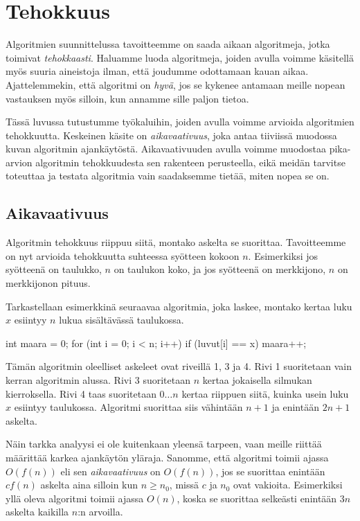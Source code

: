 \chapter{Tehokkuus}

Algoritmien suunnittelussa tavoitteemme on saada aikaan
algoritmeja, jotka toimivat \emph{tehokkaasti}.
Haluamme luoda algoritmeja, joiden avulla voimme
käsitellä myös suuria aineistoja ilman, että joudumme
odottamaan kauan aikaa.
Ajattelemmekin, että algoritmi on \emph{hyvä},
jos se kykenee antamaan meille nopean vastauksen myös silloin,
kun annamme sille paljon tietoa.

Tässä luvussa tutustumme työkaluihin, joiden avulla
voimme arvioida algoritmien tehokkuutta.
Keskeinen käsite on \emph{aikavaativuus}, joka antaa
tiiviissä muodossa kuvan algoritmin ajankäytöstä.
Aikavaativuuden avulla voimme muodostaa pika-arvion
algoritmin tehokkuudesta sen rakenteen perusteella,
eikä meidän tarvitse toteuttaa ja testata algoritmia
vain saadaksemme tietää, miten nopea se on.

\section{Aikavaativuus}

Algoritmin tehokkuus riippuu siitä,
montako askelta se suorittaa.
Tavoitteemme on nyt arvioida tehokkuutta suhteessa
syötteen kokoon $n$.
Esimerkiksi jos syötteenä on taulukko,
$n$ on taulukon koko,
ja jos syötteenä on merkkijono,
$n$ on merkkijonon pituus.

Tarkastellaan esimerkkinä seuraavaa algoritmia,
joka laskee, montako kertaa luku $x$ esiintyy
$n$ lukua sisältävässä taulukossa.

\begin{code}[numbers=left]
int maara = 0;
for (int i = 0; i < n; i++) {
    if (luvut[i] == x) {
        maara++;
    }
}
\end{code}

Tämän algoritmin oleelliset askeleet ovat riveillä
1, 3 ja 4.
Rivi 1 suoritetaan vain kerran algoritmin alussa.
Rivi 3 suoritetaan $n$ kertaa jokaisella silmukan
kierroksella.
Rivi 4 taas suoritetaan $0 \dots n$
kertaa riippuen siitä, kuinka usein
luku $x$ esiintyy taulukossa.
Algoritmi suorittaa siis vähintään $n+1$ ja enintään $2n+1$
askelta.

Näin tarkka analyysi ei ole kuitenkaan yleensä tarpeen,
vaan meille riittää määrittää karkea ajankäytön yläraja.
Sanomme, että algoritmi toimii ajassa $O(f(n))$ eli sen
\emph{aikavaativuus} on $O(f(n))$, jos se suorittaa
enintään $c f(n)$ askelta aina silloin kun $n \ge n_0$,
missä $c$ ja $n_0$ ovat vakioita.
Esimerkiksi yllä oleva algoritmi toimii ajassa $O(n)$,
koska se suorittaa selkeästi enintään $3n$ askelta
kaikilla $n$:n arvoilla.

